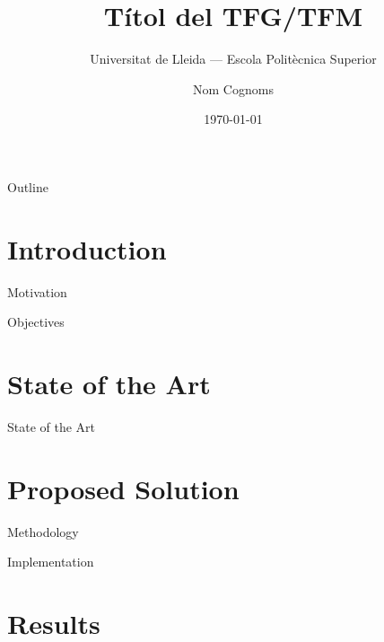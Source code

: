 \documentclass[aspectratio=169]{beamer}
\title{Títol del TFG/TFM}
\subtitle{Universitat de Lleida — Escola Politècnica Superior}
\author{Nom Cognoms}
\institute{Director/a: Nom Cognoms}
\date{\today}
\begin{document}
\begin{frame}
    \titlepage
\end{frame}

\begin{frame}{Outline}
    \tableofcontents
\end{frame}

\section{Introduction}

\begin{frame}{Motivation}

\end{frame}

\begin{frame}{Objectives}

\end{frame}

\section{State of the Art}

\begin{frame}{State of the Art}

\end{frame}

\section{Proposed Solution}

\begin{frame}{Methodology}

\end{frame}

\begin{frame}{Implementation}

\end{frame}

\section{Results}
\end{document}
